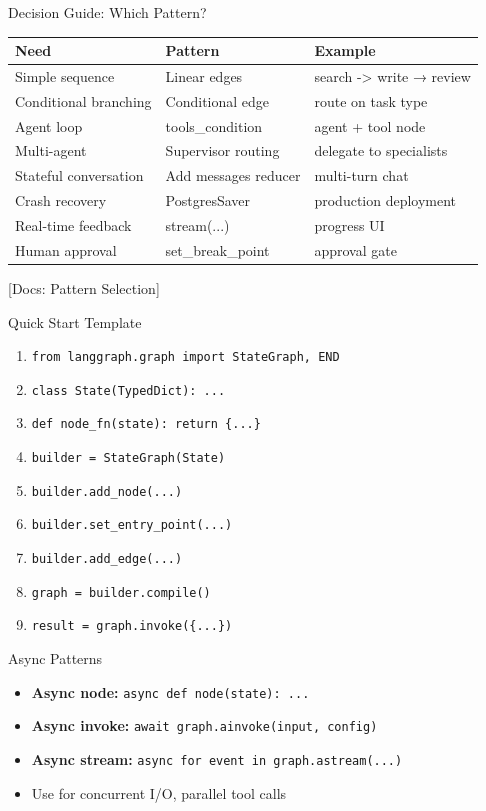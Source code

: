\documentclass[aspectratio=169,11pt]{beamer}
\newcommand{\docref}[1]{{\scriptsize\color{docgray}[Docs: #1]}}
\begin{document}
\begin{frame}{Decision Guide: Which Pattern?}
\small
\begin{tabular}{lll}
\toprule
\textbf{Need} & \textbf{Pattern} & \textbf{Example} \\
\midrule
Simple sequence & Linear edges & search -> write → review \\
Conditional branching & Conditional edge & route on task type \\
Agent loop & tools\_condition & agent + tool node \\
Multi-agent & Supervisor routing & delegate to specialists \\
Stateful conversation & Add messages reducer & multi-turn chat \\
Crash recovery & PostgresSaver & production deployment \\
Real-time feedback & stream(...) & progress UI \\
Human approval & set\_break\_point & approval gate \\
\bottomrule
\end{tabular}
\vspace{0.1cm}
\docref{Pattern Selection}
\end{frame}

\begin{frame}{Quick Start Template}
\setlength{\itemsep}{1pt}
\begin{enumerate}
\item \texttt{from langgraph.graph import StateGraph, END}
\item \texttt{class State(TypedDict): ...}
\item \texttt{def node\_fn(state): return \{...\}}
\item \texttt{builder = StateGraph(State)}
\item \texttt{builder.add\_node(...)}
\item \texttt{builder.set\_entry\_point(...)}
\item \texttt{builder.add\_edge(...)}
\item \texttt{graph = builder.compile()}
\item \texttt{result = graph.invoke(\{...\})}
\end{enumerate}
\end{frame}

\begin{frame}{Async Patterns}
\setlength{\itemsep}{1pt}
\begin{itemize}
\item \textbf{Async node:} \texttt{async def node(state): ...}
\item \textbf{Async invoke:} \texttt{await graph.ainvoke(input, config)}
\item \textbf{Async stream:} \texttt{async for event in graph.astream(...)}
\item Use for concurrent I/O, parallel tool calls
\end{itemize}
\end{frame}
\end{document}
